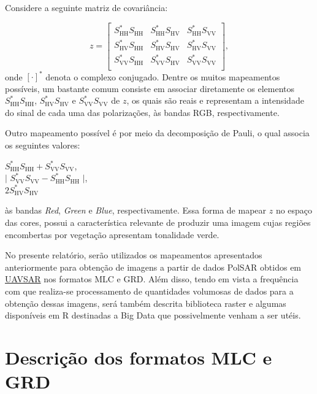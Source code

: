 \documentclass[12pt]{article}
\begin{document}
Considere a seguinte matriz de covariância:

\[
z = 
\begin{bmatrix}
	S_{\text{HH}}^{\text{*}}S_{\text{HH}} & S_{\text{HH}}^{\text{*}}S_{\text{HV}} & S_{\text{HH}}^{\text{*}}S_{\text{VV}}\\
    S_{\text{HV}}^{\text{*}}S_{\text{HH}} & S_{\text{HV}}^{\text{*}}S_{\text{HV}} & S_{\text{HV}}^{\text{*}}S_{\text{VV}}\\
    S_{\text{VV}}^{\text{*}}S_{\text{HH}} & S_{\text{VV}}^{\text{*}}S_{\text{HV}} & S_{\text{VV}}^{\text{*}}S_{\text{VV}}\\
\end{bmatrix},
\]
onde $[\cdot]^{\text{*}}$ denota o complexo conjugado. Dentre os muitos mapeamentos possíveis, um bastante comum consiste em associar diretamente os elementos $S_{\text{HH}}^{\text{*}}S_{\text{HH}}$, $S_{\text{HV}}^{\text{*}}S_{\text{HV}}$ e $S_{\text{VV}}^{\text{*}}S_{\text{VV}}$ de $z$, os quais são reais e representam a intensidade do sinal de cada uma das polarizações\cite{Frery15}, às bandas RGB, respectivamente.

Outro mapeamento possível é por meio da decomposição de Pauli, o qual associa os seguintes valores:
\begin{center}
$S_{\text{HH}}^{\text{*}}S_{\text{HH}} + S_{\text{VV}}^{\text{*}}S_{\text{VV}}$, \\
$|$ $S_{\text{VV}}^{\text{*}}S_{\text{VV}} - S_{\text{HH}}^{\text{*}}S_{\text{HH}}$ $|$, \\
$2S_{\text{HV}}^{\text{*}}S_{\text{HV}}$ \\

\end{center}
às bandas \textit{Red}, \textit{Green} e \textit{Blue}, respectivamente. Essa forma de mapear $z$ no espaço das cores, possui a característica relevante de produzir uma imagem cujas regiões encombertas por vegetação apresentam tonalidade verde.

No presente relatório, serão utilizados os mapeamentos apresentados anteriormente para obtenção de imagens a partir de dados PolSAR obtidos em \href{https://uavsar.jpl.nasa.gov}{UAVSAR} nos formatos MLC e GRD. Além disso, tendo em vista a frequência com que realiza-se processamento de quantidades volumosas de dados para a obtenção dessas imagens, será também descrita biblioteca raster e algumas disponíveis em R destinadas a Big Data que possivelmente venham a ser utéis.

\section{Descrição dos formatos MLC e GRD}
\end{document}
